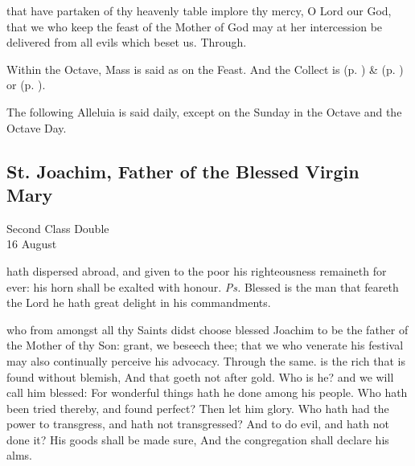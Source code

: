 
\postcommunion
{} that have partaken of thy heavenly table implore thy mercy, O Lord our God, that we who keep the feast of the Mother of God may at her intercession be delivered from all evils which beset us. Through.

\begin{rubric}
    Within the Octave, Mass is said as on the Feast. And the  Collect is  (p. \pageref{SPHolyGhost}) \&   (p. \pageref{SPAgainst}) or  (p. \pageref{SPChiefBishop}).
\end{rubric}
\begin{rubric}
    The following Alleluia is said daily, except on the Sunday in the Octave and the Octave Day.
\end{rubric}


\subsection{St. Joachim, Father of the Blessed Virgin Mary}
\begin{inhead}
    {Second Class Double\\
16 August}
\end{inhead}

\introit
{} hath dispersed abroad, and given to the poor his righteousness remaineth for ever: his horn shall be exalted with honour. \textit{Ps.} Blessed is the man that feareth the Lord he hath great delight in his commandments.

\collect
{} who from amongst all thy Saints didst choose blessed Joachim to be the father of the Mother of thy Son: grant, we beseech thee; that we who venerate his festival may also continually perceive his advocacy. Through the same.
 is the rich that is found without blemish, And that goeth not after gold. Who is he? and we will call him blessed: For wonderful things hath he done among his people. Who hath been tried thereby, and found perfect? Then let him glory. Who hath had the power to transgress, and hath not transgressed? And to do evil, and hath not done it? His goods shall be made sure, And the congregation shall declare his alms.

